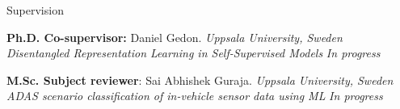 \documentclass{resume} %
\begin{document}
\begin{rSection}{Supervision}

{\bf Ph.D. Co-supervisor: }Daniel Gedon.  \hfill {\em Uppsala University, Sweden}\\
\textit{Disentangled Representation Learning in Self-Supervised Models} \hfill {\em  In progress}


{\bf M.Sc. Subject reviewer}: Sai Abhishek Guraja.  \hfill {\em Uppsala University, Sweden}\\
\textit{ADAS scenario classification of in-vehicle sensor data using ML} \hfill {\em In progress}

\end{rSection}









\end{document}
